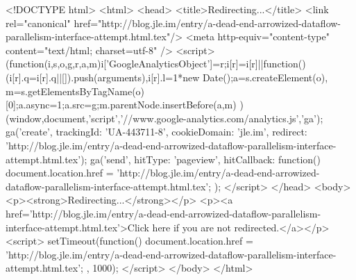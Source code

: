 <!DOCTYPE html>
<html>
<head>
<title>Redirecting...</title>
<link rel="canonical" href="http://blog.jle.im/entry/a-dead-end-arrowized-dataflow-parallelism-interface-attempt.html.tex"/>
<meta http-equiv="content-type" content="text/html; charset=utf-8" />
<script>
(function(i,s,o,g,r,a,m){i['GoogleAnalyticsObject']=r;i[r]=i[r]||function(){
(i[r].q=i[r].q||[]).push(arguments)},i[r].l=1*new Date();a=s.createElement(o),
m=s.getElementsByTagName(o)[0];a.async=1;a.src=g;m.parentNode.insertBefore(a,m)
})(window,document,'script','//www.google-analytics.com/analytics.js','ga');
ga('create', { trackingId: 'UA-443711-8', cookieDomain: 'jle.im', redirect: 'http://blog.jle.im/entry/a-dead-end-arrowized-dataflow-parallelism-interface-attempt.html.tex'});
ga('send', { hitType: 'pageview', hitCallback: function() { document.location.href = 'http://blog.jle.im/entry/a-dead-end-arrowized-dataflow-parallelism-interface-attempt.html.tex'; } });
</script>
</head>
<body>
  <p><strong>Redirecting...</strong></p>
  <p><a href='http://blog.jle.im/entry/a-dead-end-arrowized-dataflow-parallelism-interface-attempt.html.tex'>Click here if you are not redirected.</a></p>
  <script>
    setTimeout(function() { document.location.href = 'http://blog.jle.im/entry/a-dead-end-arrowized-dataflow-parallelism-interface-attempt.html.tex'; }, 1000);
  </script>
</body>
</html>
